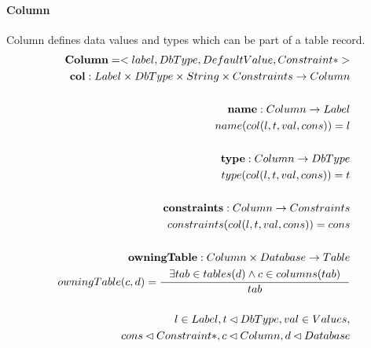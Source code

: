 \documentclass[11pt]{article}
\begin{document}
\paragraph{Column} Column defines data values and types which can be part of a table record.
\begin{align*}
	\mathbf{Column} = <label, DbType, DefaultValue, Constraint*> \\
	\mathbf{col} : Label \times DbType \times String \times Constraints \rightarrow Column \\ \\
	\mathbf{name} : Column \rightarrow Label  \\
	name(col(l, t, val, cons)) = l  \\ \\
	\mathbf{type} : Column \rightarrow DbType  \\
	type(col(l, t, val, cons)) = t  \\ \\
	\mathbf{constraints} : Column \rightarrow Constraints  \\
	constraints(col(l, t, val, cons)) = cons  \\ \\
	\mathbf{owningTable} : Column \times Database \rightarrow Table  \\
	owningTable(c, d) = \inference{\exists tab \in tables(d) \wedge c \in columns(tab)}{tab} \\ \\
l \in Label, t \lhd DbType, val \in Values,\\ cons \lhd Constraint*, c \lhd Column,d \lhd Database
\end{align*}
\end{document}
